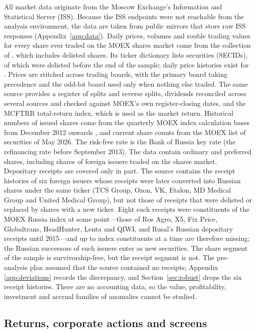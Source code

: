 \documentclass[11pt]{article}
\begin{document}
All market data originate from the Moscow Exchange's Information and Statistical Server (ISS). Because the ISS
endpoints were not reachable from the analysis environment, the data are taken from public mirrors that store raw
ISS responses (Appendix~\ref{app:data}). Daily prices, volumes and rouble trading values for every share ever traded
on the MOEX shares market come from the collection of \citet{andreev2026moexmomentum}, which includes delisted
shares. Its ticker
dictionary lists  securities (SECIDs),  of which were delisted before the end of
the sample; daily price histories exist for . Prices are stitched across trading boards, with the
primary board taking precedence and the odd-lot board used only when nothing else traded. The same source provides a
register of splits and reverse splits, dividends reconciled across several sources and checked against MOEX's own
register-closing dates, and the MCFTRR total-return index, which is used as the market return. Historical numbers of
issued shares come from the quarterly MOEX index calculation bases from December 2012 onwards \citep{moexutils}, and
current share counts from the MOEX list of securities of May 2026. The risk-free rate is the Bank of Russia key rate
(the refinancing rate before September 2013). The data contain ordinary and preferred shares, including shares of
foreign issuers traded on the shares market. Depositary receipts are covered only in part. The source contains the
receipt histories of six foreign issuers whose receipts were later converted into Russian shares under the same
ticker (TCS Group, Ozon, VK, Etalon, MD Medical Group and United Medical Group), but not those of receipts that were
delisted or replaced by shares with a new ticker. Eight such receipts were constituents of the MOEX Russia index at
some point---those of Ros Agro, X5, Fix Price, Globaltrans, HeadHunter, Lenta and QIWI, and Rusal's Russian
depositary receipts until 2015---and up to  index constituents at a time are therefore missing;
the Russian successors of such issuers enter as new securities. The share segment of the sample is survivorship-free,
but the receipt segment is not. The pre-analysis plan assumed that the source contained no receipts; Appendix
\ref{app:deviations} records the discrepancy, and Section~\ref{sec:robust} drops the six receipt histories. There are no accounting
data, so the value, profitability, investment and accrual families of anomalies cannot be studied.

\subsection{Returns, corporate actions and screens}\label{sec:returns}
\end{document}
